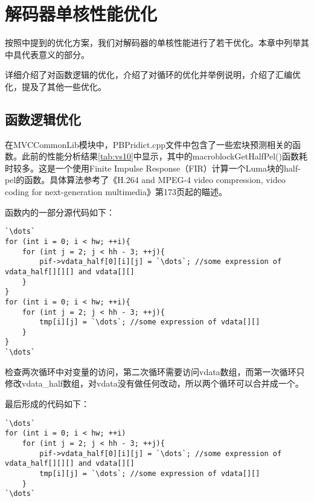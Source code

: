 

\chapter{解码器单核性能优化}
\label{cha:singlecoreopt}

按照中提到的优化方案，我们对解码器的单核性能进行了若干优化。本章中列举其中具代表意义的部分。

详细介绍了对函数逻辑的优化，介绍了对循环的优化并举例说明，介绍了汇编优化，提及了其他一些优化。

\section{函数逻辑优化}
\label{sec:singlecorelogicopt}

在MVCCommonLib模块中，PBPridict.cpp文件中包含了一些宏块预测相关的函数。此前的性能分析结果\autoref{tab:vs10}中显示，其中的macroblockGetHalfPel()函数耗时较多。这是一个使用Finite Impulse Response（FIR）计算一个Luma块的half-pel的函数。具体算法参考了《H.264 and MPEG-4 video compression, video coding for next-generation multimedia》\cite{richardson2003h}第173页起的瞄述。

函数内的一部分源代码如下：
\begin{lstlisting}[caption = {macroblockGetHalfPel()函数片段（优化前）}, label = lst:macroblockGetHalfPelorig]
`\dots`
for (int i = 0; i < hw; ++i){
	for (int j = 2; j < hh - 3; ++j){
		pif->vdata_half[0][i][j] = `\dots`; //some expression of vdata_half[][][] and vdata[][]
	}
}
for (int i = 0; i < hw; ++i){
	for (int j = 2; j < hh - 3; ++j){
		tmp[i][j] = `\dots`; //some expression of vdata[][]
	}
}
`\dots`
\end{lstlisting}

检查两次循环中对变量的访问，第二次循环需要访问vdata数组，而第一次循环只修改vdata\_half数组，对vdata没有做任何改动，所以两个循环可以合并成一个。

最后形成的代码如下：

\begin{lstlisting}[caption = {macroblockGetHalfPel()函数片段（优化后）}, label = lst:macroblockGetHalfPelopt]
`\dots`
for (int i = 0; i < hw; ++i)
	for (int j = 2; j < hh - 3; ++j){
		pif->vdata_half[0][i][j] = `\dots`; //some expression of vdata_half[][][] and vdata[][]
		tmp[i][j] = `\dots`; //some expression of vdata[][]
	}
`\dots`
\end{lstlisting}

